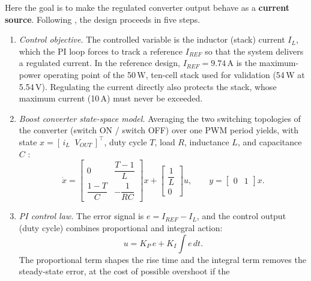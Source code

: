 Here the goal is to make the regulated converter output behave as a
\textbf{current source}. Following \cite{derbeli2017}, the design proceeds in five
steps.

\begin{enumerate}[label=\arabic*)]
    \item \emph{Control objective.} The controlled variable is the inductor
          (stack) current $I_L$, which the PI loop forces to track a reference
          $I_{REF}$ so that the system delivers a regulated current. In the
          reference design, $I_{REF}=9.74$\,A is the maximum-power operating point
          of the 50\,W, ten-cell stack used for validation (54\,W at 5.54\,V).
          Regulating the current directly also protects the stack, whose maximum
          current (10\,A) must never be exceeded.
    \item \emph{Boost converter state-space model.} Averaging the two switching
          topologies of the converter (switch ON / switch OFF) over one PWM
          period yields, with state $x=[\,i_L \;\; V_{OUT}\,]^{\top}$, duty
          cycle $T$, load $R$, inductance $L$, and capacitance $C$
          \cite{derbeli2017}:
          \begin{equation}
              \dot{x} =
              \begin{bmatrix}
                  0 & \dfrac{T-1}{L} \\[8pt]
                  \dfrac{1-T}{C} & -\dfrac{1}{RC}
              \end{bmatrix} x
              +
              \begin{bmatrix}
                  \dfrac{1}{L} \\[6pt] 0
              \end{bmatrix} u,
              \qquad
              y = \begin{bmatrix} 0 & 1 \end{bmatrix} x.
              \label{eq:boost-ss}
          \end{equation}
    \item \emph{PI control law.} The error signal is $e = I_{REF} - I_L$, and
          the control output (duty cycle) combines proportional and integral
          action:
          \begin{equation}
              u = K_P\, e + K_I \!\int\! e \, dt.
              \label{eq:pi-law}
          \end{equation}
          The proportional term shapes the rise time and the integral term
          removes the steady-state error, at the cost of possible overshoot if the

\end{enumerate}
